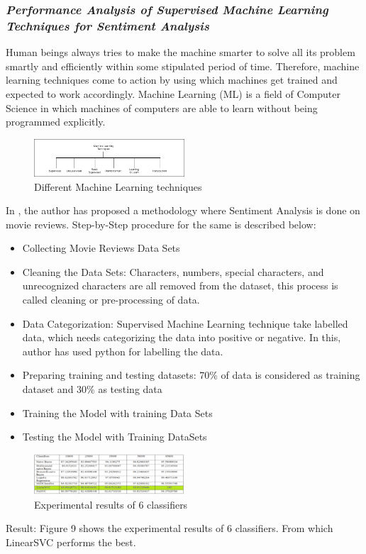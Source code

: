 \documentclass[conference]{IEEEtran}
\begin{document}
\subsubsection{\textit{Performance Analysis of Supervised Machine Learning Techniques for Sentiment Analysis\cite{b10}}}
Human beings always tries to make the machine smarter to solve all its problem smartly and efficiently within some stipulated period of time. Therefore, machine learning techniques come to action by using which machines get trained and expected to work accordingly. Machine Learning (ML) is a field of Computer Science in which machines of computers are able to learn without being programmed explicitly. \\
\begin{figure}[!ht]
	\centering
	\includegraphics[width=0.5\textwidth]{tech.png}
	\caption{Different Machine Learning techniques}
\end{figure}
In \cite{b10}, the author has proposed a methodology where Sentiment Analysis is done on movie reviews. Step-by-Step procedure for the same is described below:
\begin{itemize}
	\item Collecting Movie Reviews Data Sets
	\item Cleaning the Data Sets: Characters, numbers, special characters, and unrecognized characters are all removed from the dataset, this process is called cleaning or pre-processing of data.
	\item Data Categorization: Supervised Machine Learning technique take labelled data, which needs categorizing the data into positive or negative. In this, author has used python for labelling the data.
	\item Preparing training and testing datasets: 70\% of data is considered as training dataset and 30\% as testing data
	\item Training the Model with training Data Sets
	\item Testing the Model with Training DataSets
\end{itemize}

\begin{figure}[!ht]
	\centering
	\includegraphics[width=0.5\textwidth]{result.png}
	\caption{Experimental results of 6 classifiers}
\end{figure}
Result: Figure 9 shows the experimental results of 6 classifiers. From which LinearSVC performs the best.
\end{document}
